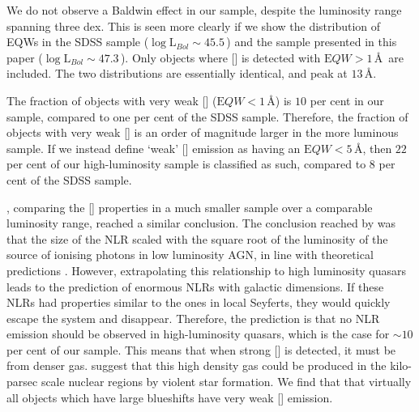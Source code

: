 We do not observe a Baldwin effect in our sample, despite the luminosity range spanning three dex. 
This is seen more clearly if we show the distribution of EQWs in the SDSS sample ($\log{\mathrm L_{Bol}} \sim 45.5$\,\ergs) and the sample presented in this paper ($\log{\mathrm L_{Bol}} \sim 47.3$\,\ergs).
Only objects where [] is detected with ${\mathrm EQW} > 1$\,\AA\, are included.
The two distributions are essentially identical, and peak at $13$\,\AA. 

The fraction of objects with very weak [] (${\mathrm EQW} < 1$\,\AA) is $10$ per cent in our sample, compared to one per cent of the SDSS sample. 
Therefore, the fraction of objects with very weak [] is an order of magnitude larger in the more luminous sample. 
If we instead define `weak' [] emission as having an ${\mathrm EQW} < 5$\,\AA, then $22$ per cent of our high-luminosity sample is classified as such, compared to $8$ per cent of the SDSS sample. 

\citet{netzer04}, comparing the [] properties in a much smaller sample over a comparable luminosity range, reached a similar conclusion. 
The conclusion reached by \citet{netzer04} was that the size of the NLR scaled with the square root of the luminosity of the source of ionising photons in low luminosity AGN, in line with theoretical predictions \citep[e.g.][]{netzer90}. 
However, extrapolating this relationship to high luminosity quasars leads to the prediction of enormous NLRs with galactic dimensions. 
If these NLRs had properties similar to the ones in local Seyferts, they would quickly escape the system and disappear. 
Therefore, the prediction is that no NLR emission should be observed in high-luminosity quasars, which is the case for $\sim10$ per cent of our sample. 
This means that when strong [] is detected, it must be from denser gas. 
\citet{netzer04} suggest that this high density gas could be produced in the kilo-parsec scale nuclear regions by violent star formation.  
We find that that virtually all objects which have large  blueshifts have very weak [] emission. 

 
